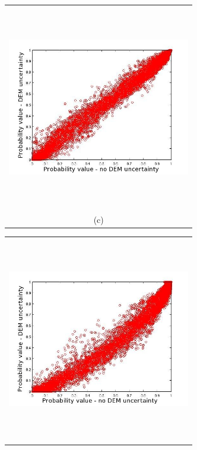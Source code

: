 \documentclass[12pt]{article}
\newcommand{\Pic}[2][0.85]{\begin{center}\texttt{[image: \#2]}
 \end{center} }
\begin{document}
\begin{figure}[H]
\begin{minipage}{0.6\textwidth}
\begin{tabular}{c}
        \end{tabular}
    \end{minipage} 
    \begin{minipage}[b]{0.6\textwidth}
        \begin{tabular}{c}
       \includegraphics[width=8cm,height=9cm,keepaspectratio]{Mammoth_Topsar_vs_meth0.jpg}\\
        (c)
        \end{tabular}
    \end{minipage}
    \begin{minipage}{0.6\textwidth}
        \begin{tabular}{c}
	\includegraphics[width=8cm,height=9cm,keepaspectratio]{Mammoth_Topsar_vs_meth3.jpg}\\

\end{tabular}
\end{minipage}
\end{figure}
\end{document}
